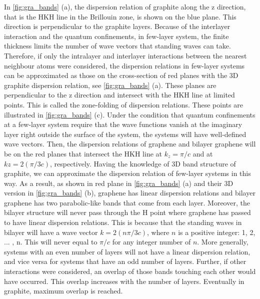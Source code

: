 In \autoref{fig:gra_bands} (a), the dispersion relation of graphite along the z direction, that is the HKH line in the Brillouin zone, is shown on the blue plane. This direction is perpendicular to the graphite layers. Because of the interlayer interaction and the quantum confinements, in few-layer system, the finite thickness limits the number of wave vectors that standing waves can take.  Therefore, if only the intralayer and interlayer interactions between the nearest neighbour atoms were considered, the dispersion relations in few-layer systems can be approximated as those on the cross-section of red planes with the 3D graphite dispersion relation, see \autoref{fig:gra_bands} (a).  These planes are perpendicular to the z direction and intersect with the HKH line at limited points. This is called the zone-folding of dispersion relations\cite{saito1998physical}. These points are illustrated in \autoref{fig:gra_bands} (c). Under the condition that quantum confinements at a few-layer system require that the wave functions vanish at the imaginary layer right outside the surface of the system, the systems will have well-defined wave vectors. Then, the dispersion relations of graphene and bilayer graphene will be on the red planes that intersect the HKH line at $k_z=\pi/c$ and at $kz=2(\pi/3c)$, respectively.  Having the knowledge of 3D band structure of graphite, we can approximate the dispersion relation of few-layer systems in this way. As a result, as shown in red plane in \autoref{fig:gra_bands} (a) and their 3D version in \autoref{fig:gra_bands} (b), graphene has linear dispersion relations and bilayer graphene has two parabolic-like bands that come from each layer. Moreover, the bilayer structure will never pass through the H point where graphene has passed to have linear dispersion relations. This is because that the standing waves in bilayer will have a wave vector $k=2(n \pi/3c)$, where $n$ is a positive integer: 1, 2, ... , n. This will never equal to $\pi/c$ for any integer number of $n$. More generally, systems with an even number of layers will not have a linear dispersion relation, and vice versa for systems that have an odd number of layers. Further, if other interactions were considered, an overlap of those bands touching each other would have occurred\cite{Partoens2006}. This overlap increases with the number of layers. Eventually in graphite, maximum overlap is reached.


